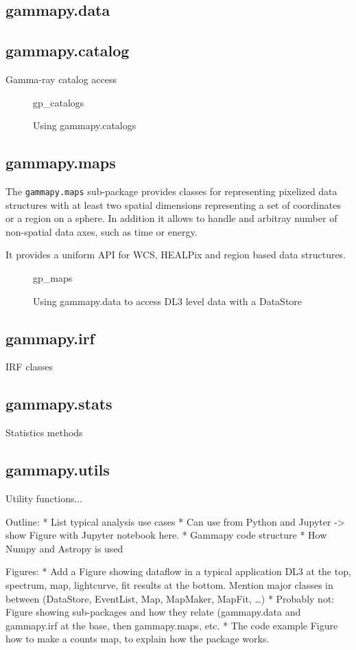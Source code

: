 \subsection{gammapy.data}

\subsection{gammapy.catalog}
Gamma-ray catalog access

\begin{figure}
{gp_catalogs}
\caption{Using gammapy.catalogs}
\label{codeexample:data}
\end{figure}


\subsection{gammapy.maps}
The \verb|gammapy.maps| sub-package provides classes for representing pixelized
data structures with at least two spatial dimensions representing a set of
coordinates or a region on a sphere. In addition it allows to handle and arbitray
number of non-spatial data axes, such as time or energy.

It provides a uniform API for WCS, HEALPix and region based data structures.

\begin{figure}


    {gp_maps}
\caption{Using gammapy.data to access DL3 level data with a DataStore}
\label{codeexample:data}
\end{figure}


\subsection{gammapy.irf}
IRF classes

\subsection{gammapy.stats}
Statistics methods


\subsection{gammapy.utils}
Utility functions...


Outline:
* List typical analysis use cases
* Can use from Python and Jupyter -> show Figure with Jupyter notebook here.
* Gammapy code structure
* How Numpy and Astropy is used


Figures:
* Add a Figure showing dataflow in a typical application
DL3 at the top, spectrum, map, lightcurve, fit results at the bottom.
Mention major classes in between (DataStore, EventList, Map, MapMaker, MapFit, …)
* Probably not: Figure showing sub-packages and how they relate (gammapy.data and gammapy.irf at the base, then gammapy.maps, etc.
* The code example Figure how to make a counts map, to explain how the package works.
